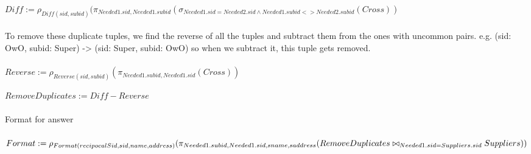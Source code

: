 \documentclass[11pt]{article}
\begin{document}
$Diff := \rho_{Diff(sid, subid)}(\pi_{Needed1.sid, Needed1.subid}(\sigma_{Needed1.sid = Needed2.sid \wedge Needed1.subid <> Needed2.subid}(Cross))$ 
\\~\\
To remove these duplicate tuples, we find the reverse of all the tuples and subtract them from the ones with uncommon pairs. e.g. (sid: OwO, subid: Super) -> (sid: Super, subid: OwO) so when we subtract it, this tuple gets removed.
\\~\\
$Reverse := \rho_{Reverse(sid, subid)}(\pi_{Needed1.subid, Needed1.sid}(Cross))$

$RemoveDuplicates := Diff - Reverse$
\\~\\
Format for answer
\\~\\
$Format := \rho_{Format(recipocalSid, sid, name, address)}(\pi_{Needed1.subid, Needed1.sid, sname, saddress}(RemoveDuplicates \break \bowtie_{Needed1.sid = Suppliers.sid} Suppliers))$
\end{document}
